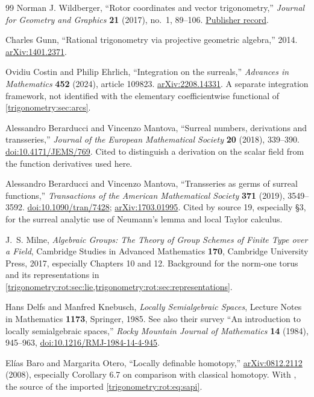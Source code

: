 \documentclass[11pt,letterpaper]{article}
\numberwithin{equation}{section}
\theoremstyle{definition}
\theoremstyle{remark}
\begin{document}
\begin{thebibliography}{99}
Norman J. Wildberger, ``Rotor coordinates and vector trigonometry,''
\emph{Journal for Geometry and Graphics} \textbf{21} (2017), no.~1, 89--106.
\href{https://www.heldermann.de/JGG/JGG21/JGG211/jgg21009.htm}{Publisher record}.

Charles Gunn, ``Rational trigonometry via projective geometric algebra,'' 2014.
\href{https://arxiv.org/abs/1401.2371}{arXiv:1401.2371}.

Ovidiu Costin and Philip Ehrlich, ``Integration on the surreals,''
\emph{Advances in Mathematics} \textbf{452} (2024), article 109823.
\href{https://arxiv.org/abs/2208.14331}{arXiv:2208.14331}.
A separate integration framework, not identified with the elementary coefficientwise functional of
\cref{trigonometry:sec:arcs}.

Alessandro Berarducci and Vincenzo Mantova, ``Surreal numbers, derivations and transseries,''
\emph{Journal of the European Mathematical Society} \textbf{20} (2018), 339--390.
\href{https://doi.org/10.4171/JEMS/769}{doi:10.4171/JEMS/769}.
Cited to distinguish a derivation on the scalar field from the function derivatives used here.

Alessandro Berarducci and Vincenzo Mantova, ``Transseries as germs of surreal functions,''
\emph{Transactions of the American Mathematical Society} \textbf{371} (2019), 3549--3592.
\href{https://doi.org/10.1090/tran/7428}{doi:10.1090/tran/7428};
\href{https://arxiv.org/abs/1703.01995}{arXiv:1703.01995}. Cited by source 19, especially \S3, for
the surreal analytic use of Neumann's lemma and local Taylor calculus.

J.~S. Milne, \emph{Algebraic Groups: The Theory of Group Schemes of Finite Type over a Field},
Cambridge Studies in Advanced Mathematics \textbf{170}, Cambridge University Press, 2017,
especially Chapters 10 and 12. Background for the norm-one torus and its representations in
\cref{trigonometry:rot:sec:lie,trigonometry:rot:sec:representations}.

Hans Delfs and Manfred Knebusch, \emph{Locally Semialgebraic Spaces}, Lecture Notes in Mathematics
\textbf{1173}, Springer, 1985. See also their survey ``An introduction to locally semialgebraic
spaces,'' \emph{Rocky Mountain Journal of Mathematics} \textbf{14} (1984), 945--963,
\href{https://doi.org/10.1216/RMJ-1984-14-4-945}{doi:10.1216/RMJ-1984-14-4-945}.

El\'ias Baro and Margarita Otero, ``Locally definable homotopy,''
\href{https://arxiv.org/abs/0812.2112}{arXiv:0812.2112} (2008), especially Corollary 6.7 on
comparison with classical homotopy. With \cite{DK}, the source of the imported
\cref{trigonometry:rot:eq:sapi}.


\end{thebibliography}
\end{document}
